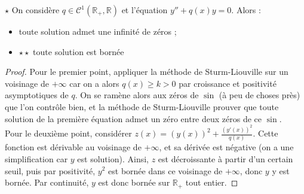 \documentclass[french,a4paper]{article}
\newcommand{\R}{\mathbb{R}}
\theoremstyle{plain}
\theoremstyle{definition}
\theoremstyle{remark}
\begin{document}
\begin{ex}[Moulin.49]{$\star$} On considère $q\in\mathcal{C}^1(\R_+,\R)$ et l'équation $y''+q(x)y=0$. Alors :
	\begin{itemize}
		\item toute solution admet une infinité de zéros ;
		\item $\star\star$ toute solution est bornée
	\end{itemize}
\end{ex}
\begin{proof}
	Pour le premier point, appliquer la méthode de Sturm-Liouville sur un voisinage de $+\infty$ car on a alors $q(x)\geqslant k>0$ par croissance et positivité asymptotiques de $q$. On se ramène alors aux zéros de $\sin$ (à peu de choses près) que l'on contrôle bien, et la méthode de Sturm-Liouville prouver que toute solution de la première équation admet un zéro entre deux zéros de ce $\sin$. \\ Pour le deuxième point, considérer $z(x)=\displaystyle (y(x))^2+\frac{(y'(x))^2}{q(x)}$. Cette fonction est dérivable au voisinage de $+\infty$, et sa dérivée est négative (on a une simplification car $y$ est solution). Ainsi, $z$ est décroissante à partir d'un certain seuil, puis par positivité, $y^2$ est bornée dans ce voisinage de $+\infty$, donc $y$ y est bornée. Par continuité, $y$ est donc bornée sur $\R_+$ tout entier.
\end{proof}
\end{document}
